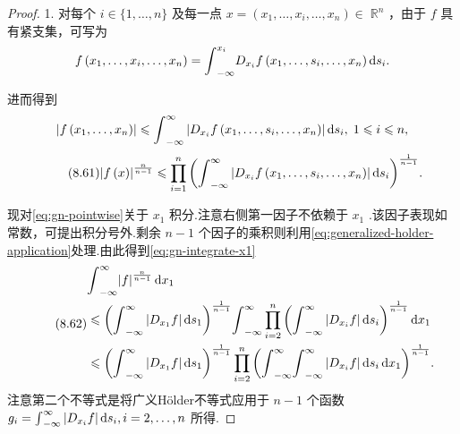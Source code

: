 \begin{proof}
1. 对每个 $i \in  \{ 1,\ldots ,n\}$ 及每一点 $x = \left( {{x}_{1},\ldots ,{x}_{i},\ldots ,{x}_{n}}\right)  \in \; {\mathbb{R}}^{n}$ ，由于 $f$ 具有紧支集，可写为
\[
f\left( {{x}_{1},\ldots ,{x}_{i},\ldots ,{x}_{n}}\right)  = {\int }_{-\infty }^{{x}_{i}}{D}_{{x}_{i}}f\left( {{x}_{1},\ldots ,{s}_{i},\ldots ,{x}_{n}}\right) \mathop{}\!\mathrm{d} s_{i}.
\]

进而得到
\[
\left| {f\left( {{x}_{1},\ldots ,{x}_{n}}\right) }\right|  \leqslant  {\int }_{-\infty }^{\infty }\left| {{D}_{{x}_{i}}f\left( {{x}_{1},\ldots ,{s}_{i},\ldots ,{x}_{n}}\right) }\right| \mathop{}\!\mathrm{d} s_{i},\;1 \leqslant  i \leqslant  n,
\]
\begin{equation}\tag{8.61}\label{eq:gn-pointwise}
{\left| f\left( x\right) \right| }^{\frac{n}{n - 1}} \leqslant  \mathop{\prod }\limits_{{i = 1}}^{n}{\left( {\int }_{-\infty }^{\infty }\left| {D}_{{x}_{i}}f\left( {x}_{1},\ldots ,{s}_{i},\ldots ,{x}_{n}\right) \right| \mathop{}\!\mathrm{d} s_{i}\right) }^{\frac{1}{n - 1}}.
\end{equation}

现对\eqref{eq:gn-pointwise}关于 ${x}_{1}$ 积分.注意右侧第一因子不依赖于 ${x}_{1}$ .该因子表现如常数，可提出积分号外.剩余 $n - 1$ 个因子的乘积则利用\eqref{eq:generalized-holder-application}处理.由此得到\eqref{eq:gn-integrate-x1}
\begin{equation}\tag{8.62}\label{eq:gn-integrate-x1}
\begin{aligned}
&{\int }_{-\infty }^{\infty }{\left| f\right| }^{\frac{n}{n - 1}}\mathop{}\!\mathrm{d} x_{1}\\
&\leqslant  {\left( {\int }_{-\infty }^{\infty }\left| {D}_{{x}_{1}}f\right| \mathop{}\!\mathrm{d}s_{1}\right) }^{\frac{1}{n - 1}}{\int }_{-\infty }^{\infty }\mathop{\prod }\limits_{{i = 2}}^{n}{\left( {\int }_{-\infty }^{\infty }\left| {D}_{{x}_{i}}f\right| \mathop{}\!\mathrm{d} s_{i}\right) }^{\frac{1}{n - 1}}\mathop{}\!\mathrm{d} x_{1} \\
&\leqslant  {\left( {\int }_{-\infty }^{\infty }\left| {D}_{{x}_{1}}f\right| \mathop{}\!\mathrm{d}s_{1}\right) }^{\frac{1}{n - 1}}\mathop{\prod }\limits_{{i = 2}}^{n}{\left( {\int }_{-\infty }^{\infty }{\int }_{-\infty }^{\infty }\left| {D}_{{x}_{i}}f\right| \mathop{}\!\mathrm{d} s_{i}\mathop{}\!\mathrm{d} x_{1}\right) }^{\frac{1}{n - 1}}.
\end{aligned}
\end{equation}
注意第二个不等式是将广义Hölder不等式应用于 $n - 1$ 个函数 ${g}_{i} = {\int }_{-\infty }^{\infty }\left| {{D}_{{x}_{i}}f}\right| \mathop{}\!\mathrm{d} s_{i},i = 2,\ldots ,n$ 所得.


\end{proof}
